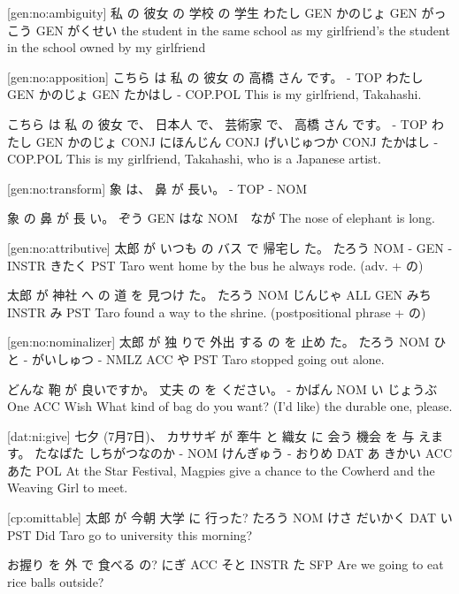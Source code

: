 [gen:no:ambiguity]
私    の   彼女    の  学校     の  学生
わたし GEN かのじょ GEN がっこう GEN がくせい
the student in the same school as my girlfriend's
the student in the school owned by my girlfriend

[gen:no:apposition]
こちら は 私     の  彼女    の  高橋   さん です。
-    TOP わたし GEN かのじょ GEN たかはし - COP.POL
This is my girlfriend, Takahashi.

こちら は  私    の  彼女    で、  日本人    で、  芸術家      で、  高橋   さん です。
-    TOP わたし GEN かのじょ CONJ にほんじん CONJ げいじゅつか CONJ たかはし - COP.POL
This is my girlfriend, Takahashi, who is a Japanese artist.

[gen:no:transform]
象 は、 鼻 が  長い。
-  TOP - NOM

象   の   鼻  が   長 い。
ぞう GEN はな NOM　なが
The nose of elephant is long.

[gen:no:attributive]
太郎   が いつも の  バス で    帰宅し た。
たろう NOM -   GEN  - INSTR きたく PST
Taro went home by the bus he always rode. (adv. + の)

太郎   が  神社    へ   の  道   を    見つけ た。
たろう NOM じんじゃ ALL GEN みち INSTR み    PST
Taro found a way to the shrine. (postpositional phrase + の)

[gen:no:nominalizer]
太郎   が  独 りで 外出 する   の    を  止め た。
たろう NOM ひと - がいしゅつ - NMLZ ACC や PST
Taro stopped going out alone.

どんな 鞄   が   良いですか。 丈夫    の  を ください。
-    かばん NOM い         じょうぶ One ACC Wish
What kind of bag do you want? (I'd like) the durable one, please.

[dat:ni:give]
七夕     (7月7日)、 カササギ が   牽牛    と 織女  に  会う 機会  を   与 えます。
たなばた しちがつなのか -    NOM けんぎゅう - おりめ DAT あ  きかい ACC あた POL
At the Star Festival, Magpies give a chance to the Cowherd and the Weaving Girl to meet.

[cp:omittable]
太郎   が  今朝 大学    に   行った?
たろう NOM けさ だいかく DAT い PST
Did Taro go to university this morning?

お握り を   外  で      食べる の?
にぎ   ACC そと INSTR  た SFP
Are we going to eat rice balls outside?
